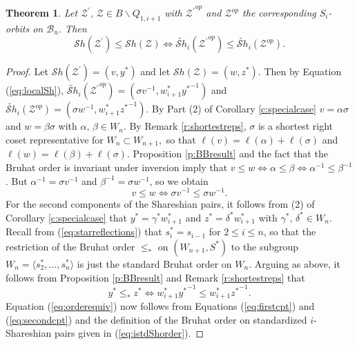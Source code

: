 \documentclass[12pt]{amsart}
\numberwithin{equation}{section}
\newtheorem{thm}{Theorem}[section]
\newcommand{\cZ}{{\mathcal Z}}
\newcommand{\Wn}{{W}_n}
\newcommand{\cW}{{ W}}
\newcommand{\B}{\mathcal{B}}
\newcommand{\Sh}{\mathcal{S}h}
\begin{document}
\begin{thm}\label{thm:Shorder}
Let $\cZ^{\prime},\, \cZ\in B\backslash Q_{1,i+1}$ with ${\cZ^{\prime}}^{op}$ and $\cZ^{op}$ 
the corresponding $S_{i}$-orbits on $\B_{n}$.  Then 
\begin{equation}\label{eq:orderequiv}
\Sh(\cZ^{\prime})\leq \Sh(\cZ)\Leftrightarrow \widetilde{\Sh}_{i}({\cZ^{\prime}}^{op})\leq \widetilde{\Sh}_{i}(\cZ^{op}). 
\end{equation}
\end{thm}

\begin{proof}
Let $\Sh(\cZ^{\prime})=(v,y^{*})$ and let $\Sh(\cZ)=(w,z^{*})$.  Then by
Equation (\ref{eq:localSh}), $\widetilde{\Sh}_{i}({\cZ^{\prime}}^{op})=(\sigma v^{-1}, w_{i+1}^{*} {y^{*}}^{-1})$ and $\widetilde{\Sh}_{i}(\cZ^{op})=(\sigma w^{-1}, w_{i+1}^{*}{z^{*}}^{-1})$.  By Part (2) of Corollary \ref{c:specialcase} $v=\alpha\sigma$ and $w=\beta \sigma$ with $\alpha,\, \beta\in \Wn$.  By Remark \ref{r:shortestreps}, $\sigma$ is a shortest right coset representative for $W_n \subset W_{n+1},$ so that 
$\ell(v)=\ell(\alpha)+\ell(\sigma)$ and $\ell(w)=\ell(\beta)+\ell(\sigma)$.  
Proposition \ref{p:BBresult} and the fact that the Bruhat order is invariant under inversion imply that $v\leq w\Leftrightarrow \alpha\leq\beta\Leftrightarrow \alpha^{-1}\leq \beta^{-1}$.  But $\alpha^{-1}=\sigma v^{-1}$ and $\beta^{-1}=\sigma w^{-1}$, so we obtain 
\begin{equation}\label{eq:firstcpt}
v\leq w\Leftrightarrow \sigma v^{-1}\leq \sigma w^{-1}.
\end{equation}
For the second components of the Shareshian pairs, it follows from (2) of Corollary \ref{c:specialcase} that 
$y^{*}=\gamma^{*}w_{i+1}^{*}$ and $z^{*}=\delta^{*}w_{i+1}^{*}$ 
with $\gamma^{*}, \, \delta^{*}\in \Wn$.  Recall from (\ref{eq:starreflections}) that $s_{i}^{*}=s_{i-1}$ for $2\leq i\leq n$, so that the restriction of the Bruhat order $\leq_{*}$  on $({\cW}_{n+1}, S^{*})$ to 
the subgroup $\Wn=\langle s_{2}^{*},\dots, s_{n}^{*}\rangle$ is just the standard Bruhat order on $\Wn$.  Arguing as above, it follows from Proposition \ref{p:BBresult} and Remark \ref{r:shortestreps} that 
\begin{equation}\label{eq:secondcpt}
y^{*}\leq_{*} z^{*}\Leftrightarrow w_{i+1}^{*} {y^{*}}^{-1}\leq w_{i+1}^{*}{z^{*}}^{-1}.
\end{equation}
Equation (\ref{eq:orderequiv}) now follows from Equations (\ref{eq:firstcpt}) and  (\ref{eq:secondcpt}) and the definition of the Bruhat order on standardized $i$-Shareshian pairs given in (\ref{eq:istdShorder}). 
\end{proof}
\end{document}
